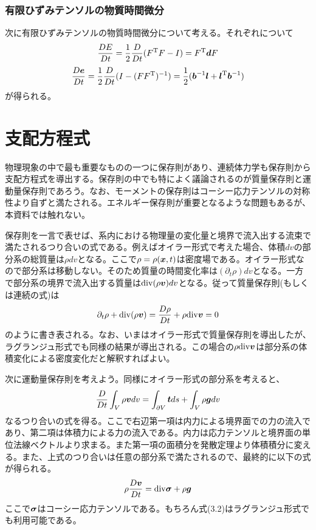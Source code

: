 \documentclass[dvipdfmx, 9pt, a4paper]{jsarticle}
\numberwithin{equation}{section}
\newcommand{\bm}[1]{{\mbox{\boldmath $#1$}}}
\begin{document}
\subsubsection{有限ひずみテンソルの物質時間微分}
次に有限ひずみテンソルの物質時間微分について考える。それぞれについて
\begin{equation}
\frac{DE}{Dt}=\frac{1}{2}\frac{D}{Dt}(F^{\rm T}F-I)=F^{\rm T}\bm dF
\end{equation}
\begin{equation}
\frac{D\bm e}{Dt}=\frac{1}{2}\frac{D}{Dt}(I-(FF^{\rm T})^{-1})=\frac{1}{2}(\bm b^{-1}\bm l+\bm l^{\rm T}\bm b^{-1})
\end{equation}
が得られる。

\section{支配方程式}
物理現象の中で最も重要なものの一つに保存則があり、連続体力学も保存則から支配方程式を導出する。保存則の中でも特によく議論されるのが質量保存則と運動量保存則であろう。なお、モーメントの保存則はコーシー応力テンソルの対称性より自ずと満たされる。エネルギー保存則が重要となるような問題もあるが、本資料では触れない。\par
保存則を一言で表せば、系内における物理量の変化量と境界で流入出する流束で満たされるつり合いの式である。例えばオイラー形式で考えた場合、体積$dv$の部分系の総質量は$\rho dv$となる。ここで$\rho=\rho(\bm x, t)$は密度場である。オイラー形式なので部分系は移動しない。そのため質量の時間変化率は$(\partial_t\rho)dv$となる。一方で部分系の境界で流入出する質量は${\rm div}(\rho\bm v)dv$となる。従って質量保存則(もしくは連続の式)は
\begin{equation}
\partial_t\rho + {\rm div}(\rho\bm v) = \frac{D\rho}{Dt}+\rho{\rm div}\bm v=0
\end{equation}
のように書き表される。なお、いまはオイラー形式で質量保存則を導出したが、ラグランジュ形式でも同様の結果が導出される。この場合の$\rho{\rm div}\bm v$は部分系の体積変化による密度変化だと解釈すればよい。\par
次に運動量保存則を考えよう。同様にオイラー形式の部分系を考えると、
\begin{equation}
\frac{D}{Dt}\int_V \rho \bm vdv=\int_{\partial V}\bm tds+\int_V \rho \bm gdv \notag
\end{equation}
なるつり合いの式を得る。ここで右辺第一項は内力による境界面での力の流入であり、第二項は体積力による力の流入である。内力は応力テンソルと境界面の単位法線ベクトルより求まる。また第一項の面積分を発散定理より体積積分に変える。また、上式のつり合いは任意の部分系で満たされるので、最終的に以下の式が得られる。
\begin{equation}
\rho\frac{D\bm v}{Dt}={\rm div}\bm \sigma +\rho\bm g
\end{equation}
ここで$\bm \sigma$はコーシー応力テンソルである。もちろん式(3.2)はラグランジュ形式でも利用可能である。
\end{document}
